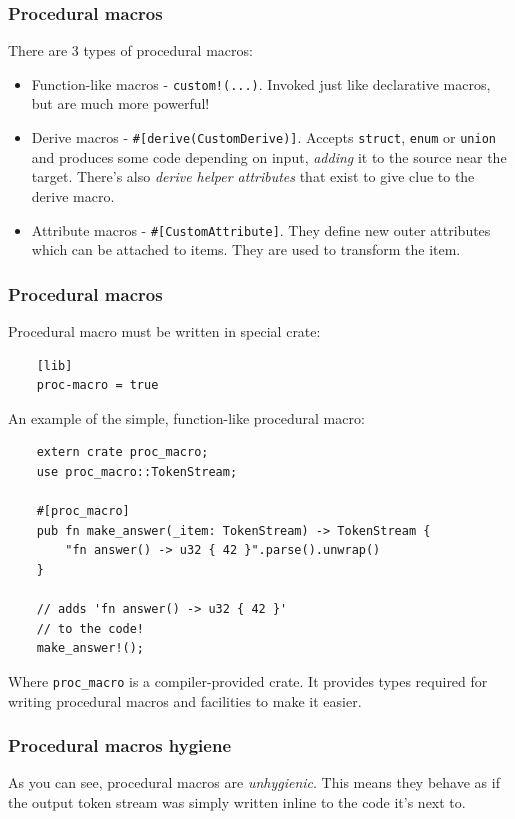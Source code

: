 \documentclass[aspectratio=1610,t]{beamer}
\begin{document}
\begin{frame}[fragile]
\frametitle{Procedural macros}
There are 3 types of procedural macros:

\begin{itemize}
    \item<1-> Function-like macros - \texttt{custom!(...)}. Invoked just like declarative macros, but are much more powerful!
    \item<2-> Derive macros - \texttt{\#[derive(CustomDerive)]}. Accepts \texttt{struct}, \texttt{enum} or \texttt{union} and produces some code depending on input, \textit{adding} it to the source near the target. There's also \textit{derive helper attributes} that exist to give clue to the derive macro.
    \item<3-> Attribute macros - \texttt{\#[CustomAttribute]}. They define new outer attributes which can be attached to items. They are used to transform the item.
\end{itemize}
\end{frame}


\begin{frame}[fragile]
\frametitle{Procedural macros}
Procedural macro must be written in special crate:

\begin{verbatim}
    [lib]
    proc-macro = true
\end{verbatim}

An example of the simple, function-like procedural macro:

\begin{verbatim}
    extern crate proc_macro;
    use proc_macro::TokenStream;

    #[proc_macro]
    pub fn make_answer(_item: TokenStream) -> TokenStream {
        "fn answer() -> u32 { 42 }".parse().unwrap()
    }

    // adds 'fn answer() -> u32 { 42 }'
    // to the code!
    make_answer!();
\end{verbatim}

Where \texttt{proc\_macro} is a compiler-provided crate. It provides types required for writing procedural macros and facilities to make it easier.
\end{frame}


\begin{frame}[fragile]
\frametitle{Procedural macros hygiene}
As you can see, procedural macros are \textit{unhygienic}. This means they behave as if the output token stream was simply written inline to the code it's next to.
\end{frame}
\end{document}
